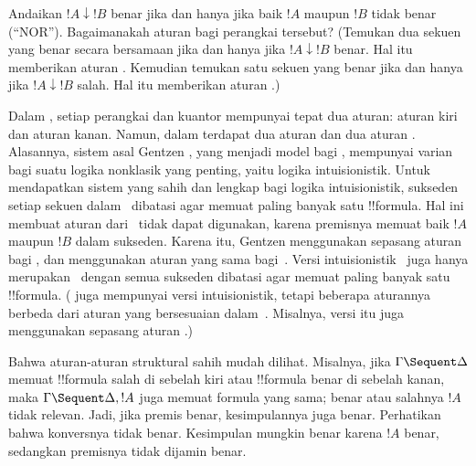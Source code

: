 \documentclass[../../../include/open-logic-section]{subfiles}
\begin{document}
\begin{prob}
Andaikan $!A\downarrow !B$ benar jika dan hanya jika baik $!A$ maupun $!B$
tidak benar (``NOR''). Bagaimanakah aturan  bagi perangkai tersebut?
(Temukan dua sekuen yang benar secara bersamaan jika dan hanya jika
$!A\downarrow !B$ benar. Hal itu memberikan aturan \RightR{\downarrow}.
Kemudian temukan satu sekuen yang benar jika dan hanya jika
$!A\downarrow !B$ salah. Hal itu memberikan aturan \LeftR{\downarrow}.)
\end{prob}

Dalam , setiap perangkai dan kuantor mempunyai tepat dua aturan:
aturan kiri dan aturan kanan. Namun, dalam  terdapat dua aturan
\LeftR{\land} dan dua aturan \RightR{\lor}. Alasannya, sistem asal Gentzen
, yang menjadi model bagi , mempunyai varian~ bagi
suatu logika nonklasik yang penting, yaitu logika intuisionistik. Untuk
mendapatkan sistem yang sahih dan lengkap bagi logika intuisionistik,
sukseden setiap sekuen dalam~ dibatasi agar memuat paling banyak satu
!!{formula}. Hal ini membuat aturan \RightR{\lor} dari~ tidak dapat
digunakan, karena premisnya memuat baik $!A$ maupun $!B$ dalam sukseden.
Karena itu, Gentzen menggunakan sepasang aturan \RightR{\lor} bagi
, dan menggunakan aturan yang sama bagi~. Versi
intuisionistik~ juga hanya merupakan~ dengan semua sukseden
dibatasi agar memuat paling banyak satu !!{formula}. ( juga
mempunyai versi intuisionistik, tetapi beberapa aturannya berbeda dari aturan
yang bersesuaian dalam~. Misalnya, versi itu juga menggunakan
sepasang aturan \RightR{\lor}.)

Bahwa aturan-aturan struktural  sahih mudah dilihat. Misalnya, jika
$\Gamma\Sequent\Delta$ memuat !!{formula} salah di sebelah kiri atau
!!{formula} benar di sebelah kanan, maka $\Gamma\Sequent\Delta,!A$ juga
memuat formula yang sama; benar atau salahnya $!A$ tidak relevan. Jadi, jika
premis \RightR{\Weakening} benar, kesimpulannya juga benar. Perhatikan bahwa
konversnya tidak benar. Kesimpulan mungkin benar karena $!A$ benar, sedangkan
premisnya tidak dijamin benar.
\end{document}
